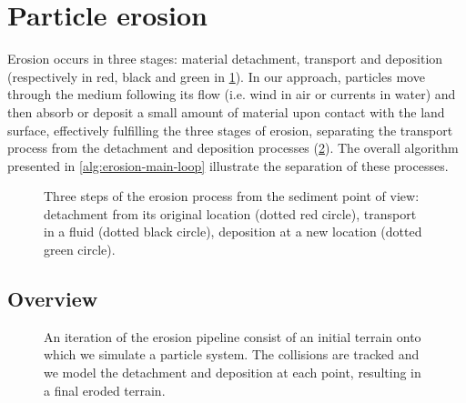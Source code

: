 \section{Particle erosion}
\label{sec:erosion-method}
Erosion occurs in three stages: material detachment, transport and deposition (respectively in red, black and green in \cref{fig:erosion-ablation_erosion}). In our approach, particles move through the medium following its flow (i.e. wind in air or currents in water) and then absorb or deposit a small amount of material upon contact with the land surface, effectively fulfilling the three stages of erosion, separating the transport process from the detachment and deposition processes (\cref{fig:erosion-pipeline-with-terrain}). The overall algorithm presented in \cref{alg:erosion-main-loop} illustrate the separation of these processes.

\begin{figure}
    \caption{Three steps of the erosion process from the sediment point of view: detachment from its original location (dotted red circle), transport in a fluid (dotted black circle), deposition at a new location (dotted green circle).}
    \label{fig:erosion-ablation_erosion}
\end{figure}

\subsection{Overview}

\begin{figure}
    \caption{An iteration of the erosion pipeline consist of an initial terrain onto which we simulate a particle system. The collisions are tracked and we model the detachment and deposition at each point, resulting in a final eroded terrain. }
    \label{fig:erosion-pipeline-with-terrain}
\end{figure}


